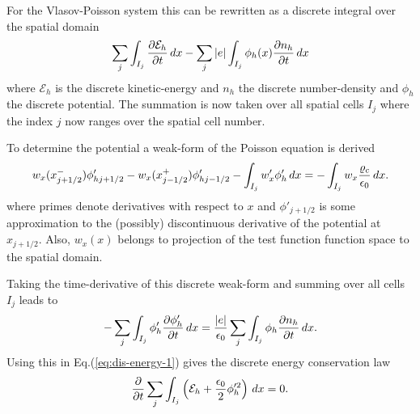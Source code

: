 \documentclass[11pt, reqno]{amsart}
\newcommand{\eqr}[1]{Eq.\thinspace(#1)}
\newcommand{\pfrac}[2]{\frac{\partial #1}{\partial #2}}
\theoremstyle{definition}
\begin{document}
For the Vlasov-Poisson system this can be rewritten as a discrete
integral over the spatial domain
\begin{align}
  \sum_{j}\int_{I_{j}} \pfrac{\mathcal{E}_h}{t}\thinspace dx
  -
  \sum_{j}
  |e|
  \int_{I_{j}}
  \phi_h(x)
  \pfrac{n_h}{t}
  \thinspace dx
  \label{eq:dis-energy-1}
\end{align}
where $\mathcal{E}_h$ is the discrete kinetic-energy and $n_h$ the
discrete number-density and $\phi_h$ the discrete potential. The
summation is now taken over all spatial cells $I_{j}$ where the index
$j$ now ranges over the spatial cell number.

To determine the potential a weak-form of the Poisson equation is
derived
\begin{align}
  w_x(x^-_{j+1/2})\phi'_{hj+1/2} -  w_x(x^+_{j-1/2})\phi'_{hj-1/2}
  -
  \int_{I_j} w_x'\phi_h'\thinspace dx
  =
  -\int_{I_j} w_x \frac{\varrho_{c}}{\epsilon_0}\thinspace dx.
\end{align}
where primes denote derivatives with respect to $x$ and
$\phi'_{j+1/2}$ is some approximation to the (possibly) discontinuous
derivative of the potential at $x_{j+1/2}$. Also, $w_x(x)$ belongs to
projection of the test function function space to the spatial domain.

Taking the time-derivative of this discrete weak-form and summing over
all cells $I_j$ leads to
\begin{align}
  -\sum_j \int_{I_j} \phi_h'\pfrac{\phi_h'}{t}\thinspace dx
  =
  \frac{|e|}{\epsilon_0}
  \sum_j
  \int_{I_j}
  \phi_h
  \pfrac{n_h}{t}
  \thinspace dx.
\end{align}
Using this in \eqr{\ref{eq:dis-energy-1}} gives the discrete energy
conservation law
\begin{align}
  \frac{\partial }{\partial t}
  \sum_{j}\int_{I_{j}} 
  \left(
  \mathcal{E}_h
  + \frac{\epsilon_0}{2}\phi_h'^2
  \right)
  \thinspace dx
  =
  0.
  \label{eq:dis-energy}
\end{align}
\end{document}
